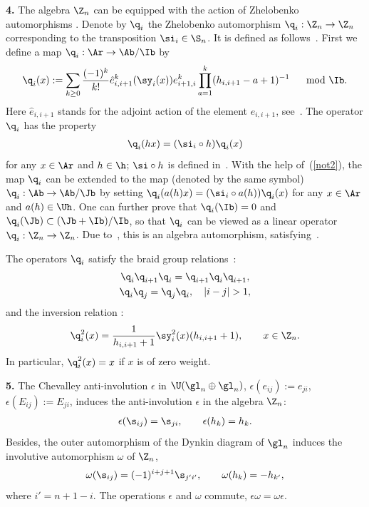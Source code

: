 {\bf 4.} The algebra $\Z_n$ can be equipped with the action of Zhelobenko automorphisms \cite{KO}.  Denote by $\q_{i}$  the Zhelobenko
automorphism $\q_i:\Z_n\to\Z_n$  corresponding to the transposition $\si_i\in\S_n$. It is def\/ined as follows~\cite{KO}. First we def\/ine a map
$\q_i:\Ar\to \Ab/\Ib$ by
\begin{gather} \label{not7}
\q_i(x):=\sum_{k\geq 0}\frac{(-1)^k}{k!} \hat{e}_{i,i+1}^k(\sy_i(x)) e_{i+1,i}^k   \prod_{a=1}^k(h_{i,i+1}-a+1)^{-1}
\quad \mod\Ib  .
\end{gather}
Here $\hat{e}_{i,i+1}$ stands for the adjoint action of the element $e_{i,i+1}$, see~.
The operator $\q_i$ has the property
\begin{gather}
\label{not2}
\q_i(hx)=(\si_i\circ h)\q_i(x)
\end{gather}
for any $x\in\Ar$ and  $h\in\h$; $\si\circ h$ is def\/ined in~. With the help of~(\ref{not2}), the map $\q_i$ can be extended
to the map (denoted by the same symbol) $\q_i:\Ab\to \Ab/\Jb$ by
setting $\q_i(a(h)x)=(\si_i\circ a(h))\q_i(x)$ for any $x\in\Ar$ and
$a(h)\in\Uh$. One can further prove that $\q_i(\Ib)=0$ and $\q_i(\Jb)\subset (\Jb+\Ib)/\Ib$,
so that $\q_i$ can be viewed as a linear operator $\q_i:\Z_n\to\Z_n$. Due to~\cite{KO},
this is an algebra automorphism, satisfying~.


The operators $\q_i$ satisfy the braid group relations~\cite{Zh}:
\begin{gather*}
\q_i\q_{i+1}\q_i=\q_{i+1}\q_{i}\q_{i+1}  ,\\
\q_i\q_j=\q_j\q_i  ,\quad |i-j|>1  ,
\end{gather*}
and the inversion relation \cite{KO}:
\begin{gather}
\label{invr}
\q_i^2(x)=\frac{1}{h_{i,i+1}+1}  \sy_i^2(x)  (h_{i,i+1}+1)  ,\qquad x\in\Z_n  .
\end{gather}
In particular, $\q_i^2(x)=x$ if $x$ is of zero weight.

{\bf 5.} The Chevalley anti-involution $\epsilon$ in $\U(\gl_n\oplus\gl_n)$,
$\epsilon(e_{ij}):=e_{ji}$, $\epsilon(E_{ij}):=E_{ji}$, induces the anti-involution $\epsilon$ in
the algebra $\Z_n$:
\begin{gather}
\epsilon(\s_{ij})=\s_{ji}  ,\qquad \epsilon(h_k)=h_k  .\label{anep}
\end{gather}
Besides, the outer automorphism of the Dynkin diagram of $\gl_n$ induces the involutive automorphism
$\omega$ of $\Z_n$,
\begin{gather}
\label{not2a}
\omega(\s_{ij}) =(-1)^{i+j+1}\s_{j'i'}  ,\qquad \omega (h_k)=-h_{k'}  ,
\end{gather}
where $i'=n+1-i$. The operations $\epsilon$ and $\omega$ commute, $\epsilon\omega =\omega\epsilon$.


